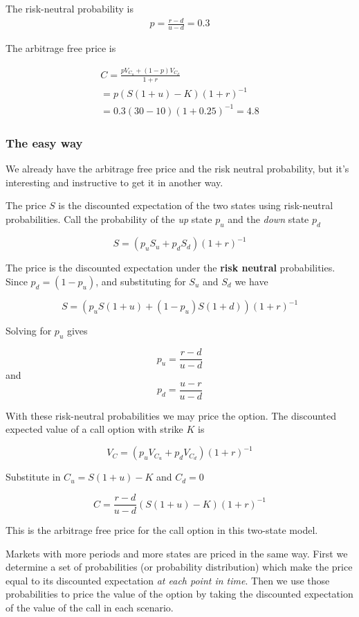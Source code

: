 The risk-neutral probability is 
\begin{eqnarray*}
p = \frac{r-d}{u-d} =0.3
\end{eqnarray*}

The arbitrage free price is

\begin{eqnarray*}
C = \frac{p V_{C_u}  + (1-p) V_{C_d}}{1+r}\\
 = p(S(1+u)-K)(1+r)^{-1} \\
= 0.3(30-10)(1+0.25)^{-1} = 4.8
\end{eqnarray*}


\subsubsection{The easy way}

We already have the arbitrage free price and the risk neutral probability, but it's interesting and instructive to get it in another way. 

The price $S$ is the discounted expectation of the two states using risk-neutral probabilities. Call the probability of the \textit{up} state $p_u$ and the \textit{down} state $p_d$
 
 \[S = (p_u S_u + p_d S_d)(1+r)^{-1}\]

The price is the discounted expectation under the \textbf{risk neutral} probabilities. Since $p_d = (1-p_u)$, and substituting for $S_u$ and $S_d$ we have

\[S = (p_u S(1+u) + (1-p_u)S(1+d))(1+r)^{-1}  \]

Solving for $p_u$ gives

\[ p_u = \frac{r-d}{u-d}\]
and
\[p_d = \frac{u-r}{u-d} \]

With these risk-neutral probabilities we may price the option. The discounted expected value of a call option with strike $K$ is

\[V_C = (p_u V_{C_u}+ p_d V_{C_d})(1+r)^{-1}\]

Substitute in $C_u = S(1+u)-K$ and $C_d = 0$

\[C = \frac{r-d}{u-d} (S(1+u)-K)(1+r)^{-1}\]

This is the arbitrage free price for the call option in this two-state model. 

Markets with more periods and more states are priced in the same way. First we determine a set of probabilities (or probability distribution) which make the price equal to its discounted expectation \textit{at each point in time}. Then we use those probabilities to price the value of the option by taking the discounted expectation of the value of the call in each scenario.


